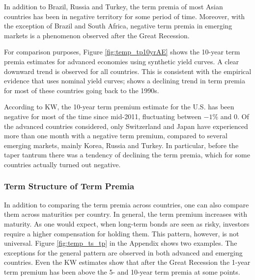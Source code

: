  In addition to Brazil, Russia and Turkey, the term premia of most Asian countries has been in negative territory for some period of time. Moreover, with the exception of Brazil and South Africa, negative term premia in emerging markets is a phenomenon observed after the Great Recession.

%	

For comparison purposes, Figure \ref{fig:temp_tp10yrAE} shows the 10-year term premia estimates for advanced economies using synthetic yield curves. A clear downward trend is observed for all countries. This is consistent with the empirical evidence that uses nominal yield curves; \cite{Wright:2011} shows  a declining trend in term premia for most of these countries going back to the 1990s.
	

According to KW, the 10-year term premium estimate for the U.S. has been negative for most of the time since mid-2011, fluctuating between $-1$\% and $0$. Of the advanced countries considered, only Switzerland and Japan have experienced more than one month with a negative term premium, compared to several emerging markets, mainly Korea, Russia and Turkey. In particular, before the taper tantrum there was a tendency of declining the term premia, which for some countries actually turned out negative.

\subsubsection{Term Structure of Term Premia}
In addition to comparing the term premia across countries, one can also compare them across maturities per country. In general, the term premium increases with maturity. As one would expect, when long-term bonds are seen as risky, investors require a higher compensation for holding them. This pattern, however, is not universal. Figure \ref{fig:temp_ts_tp} in the Appendix shows two examples. The exceptions for the general pattern are observed in both advanced and emerging countries. Even the KW estimates show that after the Great Recession the 1-year term premium has been above the 5- and 10-year term premia at some points.
%	

